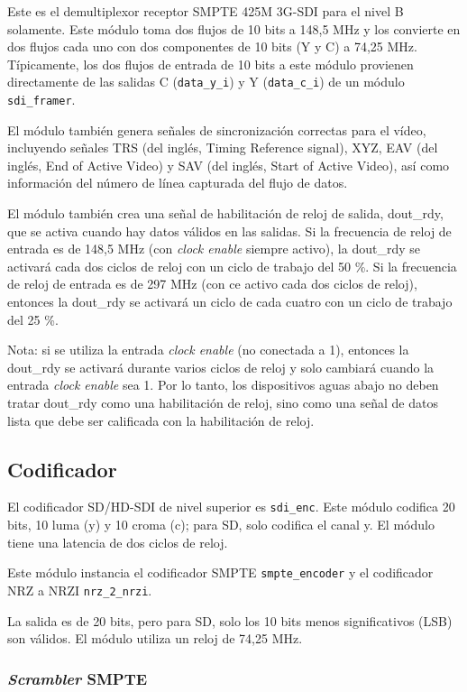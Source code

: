 Este es el demultiplexor receptor SMPTE 425M 3G-SDI para el nivel B solamente.
Este módulo toma dos flujos de 10 bits a 148,5 MHz y los convierte en dos flujos
cada uno con dos componentes de 10 bits (Y y C) a 74,25 MHz. Típicamente, los
dos flujos de entrada de 10 bits a este módulo provienen directamente de las
salidas C (\texttt{data\_y\_i}) y Y (\texttt{data\_c\_i}) de un módulo \texttt{sdi\_framer}.

El módulo también genera señales de sincronización correctas para el vídeo,
incluyendo señales TRS  (del inglés, Timing Reference signal), XYZ, EAV (del inglés, End of Active Video) y SAV (del inglés, Start of Active Video), así como información del número de
línea capturada del flujo de datos.

El módulo también crea una señal de habilitación de reloj de salida, dout\_rdy,
que se activa cuando hay datos válidos en las salidas. Si la frecuencia de reloj
de entrada es de 148,5 MHz (con \textit{clock enable} siempre activo), la dout\_rdy se activará cada
dos ciclos de reloj con un ciclo de trabajo del 50 \%. Si la frecuencia de reloj
de entrada es de 297 MHz (con ce activo cada dos ciclos de reloj), entonces la
dout\_rdy se activará un ciclo de cada cuatro con un ciclo de trabajo del 25 \%.

Nota: si se utiliza la entrada \textit{clock enable} (no conectada a 1), entonces la dout\_rdy se
activará durante varios ciclos de reloj y solo cambiará cuando la entrada \textit{clock enable}
sea 1. Por lo tanto, los dispositivos aguas abajo no deben tratar dout\_rdy
como una habilitación de reloj, sino como una señal de datos lista que debe
ser calificada con la habilitación de reloj.

\subsection{Codificador}

El codificador SD/HD-SDI de nivel superior es \texttt{sdi\_enc}. Este módulo codifica
20 bits, 10 luma (y) y 10 croma (c); para SD, solo codifica el canal y. El
módulo tiene una latencia de dos ciclos de reloj.

Este módulo instancia el codificador SMPTE \texttt{smpte\_encoder} y el codificador
NRZ a NRZI \texttt{nrz\_2\_nrzi}.

La salida es de 20 bits, pero para SD, solo los 10 bits menos significativos
(LSB) son válidos. El módulo utiliza un reloj de 74,25 MHz.

\subsubsection{\textit{Scrambler} SMPTE}

